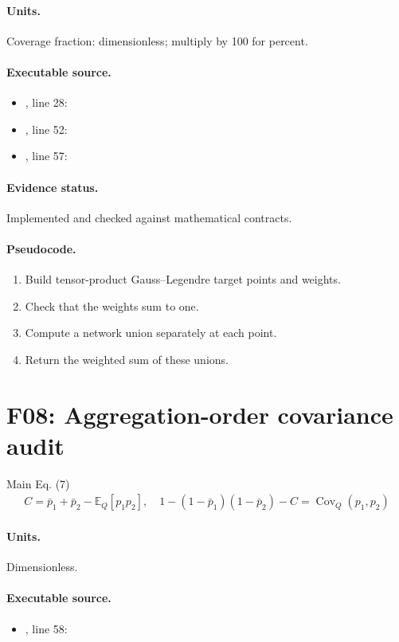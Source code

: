 \documentclass[10pt]{article}
\begin{document}
\paragraph{Units.} Coverage fraction: dimensionless; multiply by 100 for percent.
\paragraph{Executable source.}
\begin{itemize}[leftmargin=*]
\item {}, line 28: 
\item {}, line 52: 
\item {}, line 57: 
\end{itemize}
\paragraph{Evidence status.} Implemented and checked against mathematical contracts.
\paragraph{Pseudocode.}
\begin{enumerate}[leftmargin=*]
\item Build tensor-product Gauss--Legendre target points and weights.
\item Check that the weights sum to one.
\item Compute a network union separately at each point.
\item Return the weighted sum of these unions.
\end{enumerate}
\newpage
\section*{F08: Aggregation-order covariance audit}
Main Eq. (7)
\begin{gather*}C=\bar p_1+\bar p_2-\mathbb E_Q[p_1p_2],\quad 1-(1-\bar p_1)(1-\bar p_2)-C=\operatorname{Cov}_Q(p_1,p_2)\end{gather*}
\paragraph{Units.} Dimensionless.
\paragraph{Executable source.}
\begin{itemize}[leftmargin=*]
\item {}, line 58: 
\end{itemize}
\end{document}
